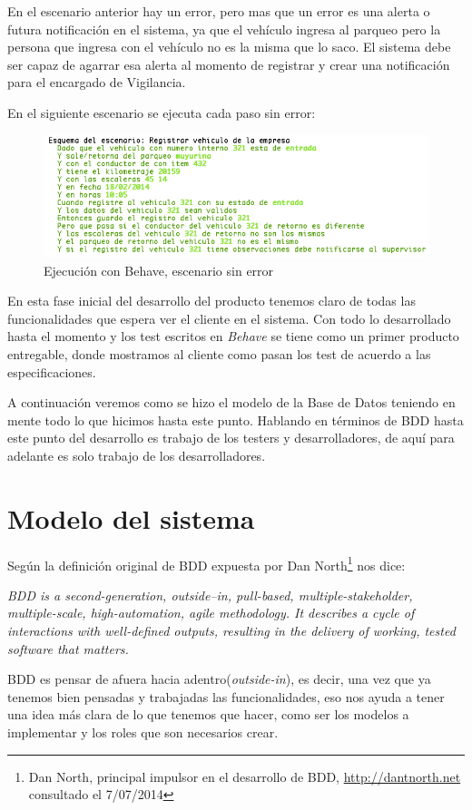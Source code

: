 En el escenario anterior hay un error, pero mas que un error es una alerta o futura
notificación en el sistema, ya que el vehículo ingresa al parqueo pero la persona
que ingresa con el vehículo no es la misma que lo saco. El sistema debe ser capaz
de agarrar esa alerta al momento de registrar y crear una notificación para el
encargado de Vigilancia.

En el siguiente escenario se ejecuta cada paso sin error:

\begin{figure}[h]
  \begin{center}
  \includegraphics[width=1.1\textwidth]{figures/chapter4/behave_registro02.png}
  \caption[Ejecución con Behave sin error]{Ejecución con Behave, escenario sin error}
\end{center}
\end{figure}

En esta fase inicial del desarrollo del producto tenemos claro de todas las
funcionalidades que espera ver el cliente en el sistema. Con todo lo desarrollado
hasta el momento y los test escritos en {\it Behave} se tiene como un primer
producto entregable, donde mostramos al cliente como pasan los test de acuerdo a
las especificaciones.

A continuación veremos como se hizo el modelo de la Base de Datos teniendo en
mente todo lo que hicimos hasta este punto. Hablando en términos de BDD hasta este
punto del desarrollo es trabajo de los testers y desarrolladores, de aquí para
adelante es solo trabajo de los desarrolladores.

\section{Modelo del sistema}
Según la definición original de BDD expuesta por Dan North\footnote{Dan North,
  principal impulsor en el desarrollo de BDD, \url{http://dantnorth.net}
consultado el 7/07/2014} nos dice:
\vspace{0.5cm}
\begin{mdframed}
{\it BDD is a second-generation, outside–in, pull-based, multiple-stakeholder,
  multiple-scale,  high-automation, agile methodology. It describes a cycle of
  interactions with well-defined outputs, resulting in the delivery of working,
  tested software that matters.
}
\end{mdframed}
\vspace{0.5cm}
BDD es pensar de afuera hacia adentro({\it outside-in}), es decir, una vez que
ya tenemos bien pensadas y trabajadas las funcionalidades, eso nos ayuda a tener una
idea más clara de lo que tenemos que hacer, como ser los modelos a implementar y
los roles que son necesarios crear.

